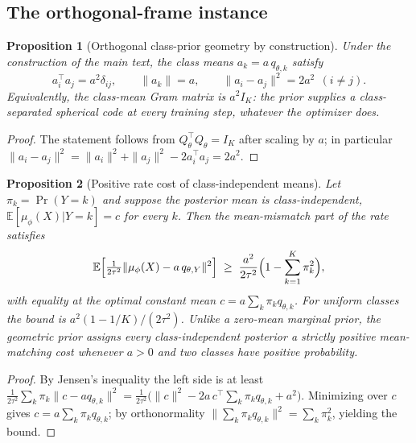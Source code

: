 \documentclass{article}
\theoremstyle{plain}
\newtheorem{proposition}{Proposition}[section]
\theoremstyle{remark}
\newcommand{\E}{\mathbb{E}}
\begin{document}
\subsection{The orthogonal-frame instance}

\begin{proposition}[Orthogonal class-prior geometry by construction]
\label{prop:opb-frame}
Under the construction of the main text, the class means $a_k = a\,q_{\theta,k}$
satisfy
\begin{equation}
a_i^{\top} a_j = a^2 \delta_{ij},
\qquad
\|a_k\| = a,
\qquad
\|a_i - a_j\|^2 = 2a^2 \ \ (i \ne j) .
\end{equation}
Equivalently, the class-mean Gram matrix is $a^2 I_K$: the prior supplies a
class-separated spherical code at every training step, whatever the optimizer does.
\end{proposition}

\begin{proof}
The statement follows from $Q_\theta^{\top}Q_\theta = I_K$ after scaling
by $a$; in particular
$\|a_i - a_j\|^2 = \|a_i\|^2 + \|a_j\|^2 - 2a_i^{\top}a_j = 2a^2$.
\end{proof}

\begin{proposition}[Positive rate cost of class-independent means]
\label{prop:opb-collapse}
Let $\pi_k = \Pr(Y = k)$ and suppose the posterior mean is class-independent,
$\E[\mu_\phi(X) | Y = k] = c$ for every $k$. Then the mean-mismatch part of the rate
satisfies
\begin{equation}
\E\Bigl[ \tfrac{1}{2\tau^2} \|\mu_\phi(X) - a\,q_{\theta,Y}\|^2 \Bigr]
\;\ge\; \frac{a^2}{2\tau^2}\Bigl( 1 - \sum_{k=1}^{K} \pi_k^2 \Bigr) ,
\end{equation}
with equality at the optimal constant mean $c = a \sum_k \pi_k q_{\theta,k}$. For
uniform classes the bound is $a^2(1 - 1/K)/(2\tau^2)$. Unlike a zero-mean marginal
prior, the geometric prior assigns every class-independent posterior a strictly
positive mean-matching cost whenever $a > 0$ and two classes have positive
probability.
\end{proposition}

\begin{proof}
By Jensen's inequality the left side is at least
$\tfrac{1}{2\tau^2}\sum_k \pi_k \|c - a q_{\theta,k}\|^2
= \tfrac{1}{2\tau^2}\bigl(\|c\|^2 - 2a\,c^{\top}\!\sum_k\pi_k q_{\theta,k} + a^2\bigr)$.
Minimizing over $c$ gives $c = a\sum_k\pi_k q_{\theta,k}$; by orthonormality
$\|\sum_k\pi_k q_{\theta,k}\|^2 = \sum_k \pi_k^2$, yielding the bound.
\end{proof}
\end{document}
